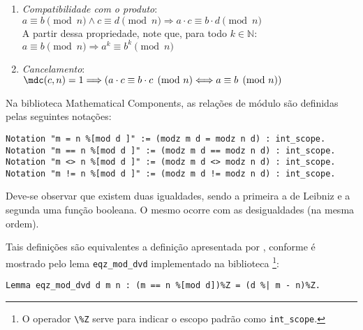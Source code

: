 \begin{enumerate}
    \item \label{item:propcong6-produto} \textit{Compatibilidade com o produto}: 
    \\
    $a \equiv b \pmod{n} \land c \equiv d \pmod{n} \Longrightarrow a \cdot c \equiv b \cdot d \pmod{n}$ 
    \\
    A partir dessa propriedade, note que, para todo $k \in \mathbb{N}$:
    \\
    $a \equiv b \pmod{n} \Longrightarrow a^k \equiv b^k \pmod{n}$

    \item \label{item:propcong7-cancelamento} \textit{Cancelamento}:
    \\
    $\mdc(c, n) = 1 \Longrightarrow (a \cdot c \equiv b \cdot c \pmod{n} \Longleftrightarrow a \equiv b \pmod{n})$
    \\
\end{enumerate}

Na biblioteca Mathematical Components, as relações de módulo são definidas pelas seguintes notações:
    \begin{lstlisting}[language=coq,frame=single,tabsize=1]
Notation "m = n %[mod d ]" := (modz m d = modz n d) : int_scope.
Notation "m == n %[mod d ]" := (modz m d == modz n d) : int_scope.
Notation "m <> n %[mod d ]" := (modz m d <> modz n d) : int_scope.
Notation "m != n %[mod d ]" := (modz m d != modz n d) : int_scope.
    \end{lstlisting}
Deve-se observar que existem duas igualdades, sendo a primeira a de Leibniz e a segunda uma função booleana. O mesmo ocorre com as desigualdades (na mesma ordem).

Tais definições são equivalentes a definição apresentada por \cite{book:2399854}, conforme é mostrado pelo lema \lstinline[language = coq]{eqz_mod_dvd} implementado na biblioteca \footnote{O operador 
\lstinline[language = coq]{\%Z} serve para indicar o escopo padrão como \lstinline[language=coq]|int_scope|.}:
    \begin{lstlisting}[language=coq,frame=single,tabsize=1]
Lemma eqz_mod_dvd d m n : (m == n %[mod d])%Z = (d %| m - n)%Z.
    \end{lstlisting}

